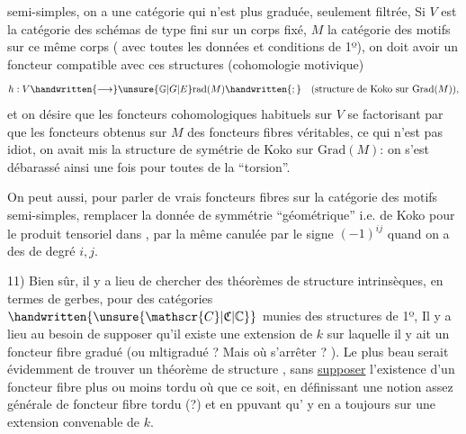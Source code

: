 semi-simples, on a une catégorie qui n'est plus graduée, seulement filtrée,  Si $V$ est la catégorie des schémas de type fini sur un corps fixé, $M$ la catégorie des motifs sur ce même corps ( avec toutes les données et conditions de 1º)\handwritten{\deleted{\unsure{(}}}, on doit avoir un foncteur  compatible avec ces structures  (cohomologie motivique)
\[
h:V\handwritten{\longrightarrow}\unsure{\mathbb{G}|G|E}\mathrm{rad}(M)\handwritten{;}\quad\text{(structure de Koko sur }\mathrm{Grad}(M)\text{)},
\]
et on désire que les foncteurs cohomologiques habituels sur $V$ se factorisant par  que les foncteurs  obtenus sur $M$  des foncteurs fibres  véritables, ce qui n'est pas idiot,  on avait mis la structure de symétrie de Koko sur $\mathrm{Grad}(M)$: on s'est débarassé ainsi une fois pour toutes de la ``torsion''.

On peut aussi, pour parler de vrais foncteurs fibres sur la catégorie des motifs semi-simples, remplacer la donnée de symmétrie ``géométrique'' i.e. de Koko pour le produit tensoriel dans , par la même canulée par le signe $(-1)^{ij}$ quand on a des  de degré $i,j$.

11) Bien sûr, il y a lieu de chercher des théorèmes de structure intrinsèques, en termes de gerbes, pour des catégories $\handwritten{\unsure{\mathscr{C}|\mathfrak{C}|\mathbb{C}}}$ munies des structures de 1º, Il y a lieu au besoin de supposer qu'il existe une extension de $k$ sur laquelle il y ait un foncteur fibre  gradué (ou mltigradué ? Mais où s'arrêter ? ). Le plus beau serait évidemment de trouver un théorème de structure , sans \uline{supposer} l'existence d'un foncteur fibre plus ou moins tordu où que ce soit, en définissant une notion assez générale de foncteur fibre tordu (?) et en ppuvant qu' y en a toujours sur une extension convenable de $k$.
